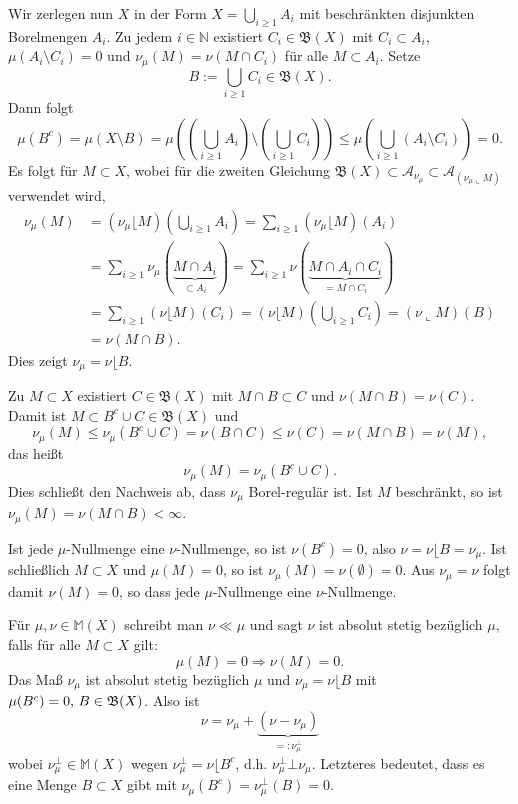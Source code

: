 \documentclass[a4paper,twoside,DIV15,BCOR12mm]{scrbook}
\newcommand{\borel}{\mathfrak B}
\newcommand{\MR}{\lfloor}
\begin{document}
\begin{beweis}
Wir zerlegen nun $X$ in der Form $X=\bigcup_{i\ge 1}A_i$ mit beschränkten disjunkten Borelmengen $A_i$. 
Zu jedem $i\in\mathbb{N}$ existiert $C_i\in \borel(X)$ mit $C_i\subset A_i$, $\mu(A_i\setminus C_i)=0$ und  $\nu_\mu(M)=\nu(M\cap C_i)$ für alle $M\subset A_i$. Setze 
$$B:=\bigcup_{i\ge 1}C_i\in \borel(X).$$
Dann folgt
$$
\mu(B^c)=\mu(X\setminus B)=\mu((\bigcup_{i\ge 1}A_i) \setminus(\bigcup_{i\ge 1}C_i))\le\mu(\bigcup_{i\ge 1}(A_i\setminus C_i))=0.
$$
Es folgt für $M\subset X$, wobei für die zweiten Gleichung $\borel (X)\subset\mathcal{A}_{\nu_\mu}\subset
\mathcal{A}_{(\nu_\mu\llcorner M)}$ verwendet wird,
\begin{align*}
\nu_\mu(M)&=(\nu_\mu\MR M)(\bigcup_{i\ge 1}A_i)=\sum_{i\ge 1}(\nu_\mu\MR M)(A_i)\\
&=\sum_{i\ge 1}\nu_\mu(\underbrace{M\cap A_i}_{\subset A_i})=\sum_{i\ge 1}\nu(\underbrace{M\cap A_i\cap C_i}_{=M\cap C_i})\\
&=\sum_{i\ge 1}(\nu\MR M)(C_i)=(\nu\MR M)(\bigcup_{i\ge 1} C_i)=(\nu\llcorner M)(B)\\
&=\nu(M\cap B).
\end{align*}
Dies zeigt $\nu_\mu=\nu\MR B$.

Zu $M\subset X$ existiert $C\in\borel (X)$ mit $M\cap B\subset C$ und $\nu(M\cap B)=\nu(C)$. Damit ist 
$M\subset B^c\cup C\in \borel(X)$ und
$$
\nu_\mu(M)\le \nu_\mu(B^c\cup C)=\nu(B\cap C)\le\nu(C)=\nu(M\cap B)=\nu(M),
$$
das heißt
$$
\nu_\mu(M)=\nu_\mu(B^c\cup C).
$$
Dies schließt den Nachweis ab, dass $\nu_\mu$ Borel-regulär ist. Ist  $M$ beschränkt, 
so ist $\nu_\mu(M)=\nu(M\cap B)<\infty$. 

Ist jede $\mu$-Nullmenge eine $\nu$-Nullmenge, so ist $\nu(B^c)=0$, 
also $\nu=\nu\MR B=\nu_\mu$. Ist schließlich $M\subset X$ und $\mu(M)=0$, so ist 
$\nu_\mu(M)=\nu(\emptyset)=0$. Aus $\nu_\mu=\nu$ folgt damit $\nu(M)=0$, so dass jede $\mu$-Nullmenge  eine $\nu$-Nullmenge.
\end{beweis}

\begin{bemerkung}
Für \(\mu, \nu \in \mathbb{M}(X)\) schreibt man \(\nu \ll \mu\) und sagt \(\nu\) ist absolut stetig bezüglich \(\mu\), falls für alle \(M \subset X\) gilt: 
\[
\mu(M) = 0 \Rightarrow \nu(M) = 0.
\]
Das Maß \(\nu_\mu\) ist absolut stetig bezüglich \(\mu\) und \(\nu_\mu = \nu\MR B\) mit \(\mu(B^c) = 0,$ $B \in \borel(X)\). Also ist
\[
\nu = \nu_\mu + \underbrace{(\nu - \nu_\mu)}_{=: \nu_\mu^\bot}
\]
wobei \(\nu_\mu^\bot \in \mathbb{M}(X)\) wegen \(\nu_\mu^\bot = \nu\MR B^c\), d.h. \(\nu_\mu^\bot \bot \nu_\mu \). 
Letzteres bedeutet, dass es eine Menge $B\subset X$ gibt mit \(\nu_\mu(B^c) = \nu_\mu^\bot(B) = 0\).
\end{bemerkung}
\end{document}

